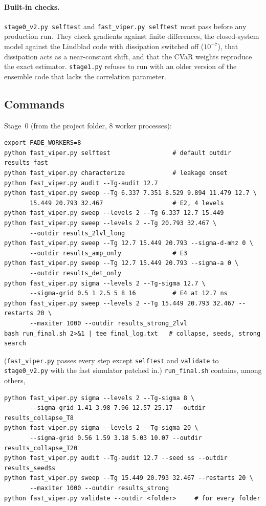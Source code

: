 \documentclass[aps,pra,onecolumn,notitlepage,superscriptaddress,nofootinbib,floatfix]{revtex4-2}
\begin{document}
\paragraph*{Built-in checks.} \texttt{stage0\_v2.py selftest} and
\texttt{fast\_viper.py selftest} must pass before any production run. They
check gradients against finite differences, the closed-system model against
the Lindblad code with dissipation switched off ($10^{-7}$), that dissipation
acts as a near-constant shift, and that the CVaR weights reproduce the exact
estimator. \texttt{stage1.py} refuses to run with an older version of the
ensemble code that lacks the correlation parameter.

\subsection{Commands}

Stage~0 (from the project folder, 8 worker processes):
\begin{verbatim}
export FADE_WORKERS=8
python fast_viper.py selftest                 # default outdir results_fast
python fast_viper.py characterize             # leakage onset
python fast_viper.py audit --Tg-audit 12.7
python fast_viper.py sweep --Tg 6.337 7.351 8.529 9.894 11.479 12.7 \
       15.449 20.793 32.467                   # E2, 4 levels
python fast_viper.py sweep --levels 2 --Tg 6.337 12.7 15.449
python fast_viper.py sweep --levels 2 --Tg 20.793 32.467 \
       --outdir results_2lvl_long
python fast_viper.py sweep --Tg 12.7 15.449 20.793 --sigma-d-mhz 0 \
       --outdir results_amp_only              # E3
python fast_viper.py sweep --Tg 12.7 15.449 20.793 --sigma-a 0 \
       --outdir results_det_only
python fast_viper.py sigma --levels 2 --Tg-sigma 12.7 \
       --sigma-grid 0.5 1 2.5 5 8 16          # E4 at 12.7 ns
python fast_viper.py sweep --levels 2 --Tg 15.449 20.793 32.467 --restarts 20 \
       --maxiter 1000 --outdir results_strong_2lvl
bash run_final.sh 2>&1 | tee final_log.txt   # collapse, seeds, strong search
\end{verbatim}
(\texttt{fast\_viper.py} passes every step except \texttt{selftest} and
\texttt{validate} to \texttt{stage0\_v2.py} with the fast simulator patched
in.) \texttt{run\_final.sh}
contains, among others,
\begin{verbatim}
python fast_viper.py sigma --levels 2 --Tg-sigma 8 \
       --sigma-grid 1.41 3.98 7.96 12.57 25.17 --outdir results_collapse_T8
python fast_viper.py sigma --levels 2 --Tg-sigma 20 \
       --sigma-grid 0.56 1.59 3.18 5.03 10.07 --outdir results_collapse_T20
python fast_viper.py audit --Tg-audit 12.7 --seed $s --outdir results_seed$s
python fast_viper.py sweep --Tg 15.449 20.793 32.467 --restarts 20 \
       --maxiter 1000 --outdir results_strong
python fast_viper.py validate --outdir <folder>     # for every folder
\end{verbatim}
\end{document}
